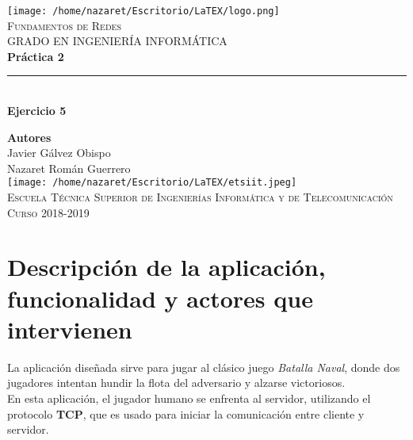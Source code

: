 \documentclass[11pt,a4paper]{article}
\begin{document}
\begin{titlepage}

\begin{minipage}{\textwidth}

\centering
\texttt{[image: /home/nazaret/Escritorio/LaTEX/logo.png]}\\

\textsc{\Large Fundamentos de Redes\\[0.2cm]}
\textsc{GRADO EN INGENIERÍA INFORMÁTICA}\\[1cm]

{\Huge\bfseries Práctica 2\\}
\noindent\rule[-1ex]{\textwidth}{3pt}\\[3.5ex]
{\large\bfseries Ejercicio 5}
\end{minipage}

\vspace{1.5cm}
\begin{minipage}{\textwidth}
\centering

\textbf{Autores}\\ {Javier Gálvez Obispo\\Nazaret Román Guerrero}\\[2.5ex]
\texttt{[image: /home/nazaret/Escritorio/LaTEX/etsiit.jpeg]}\\[0.1cm]
\vspace{1cm}
\textsc{Escuela Técnica Superior de Ingenierías Informática y de Telecomunicación}\\
\vspace{1cm}
\textsc{Curso 2018-2019}
\end{minipage}
\end{titlepage}

\tableofcontents
\thispagestyle{empty}

\newpage

\section{Descripción de la aplicación, funcionalidad y actores que intervienen}

La aplicación diseñada sirve para jugar al clásico juego \textit{Batalla Naval}, donde dos jugadores intentan hundir la flota del adversario y alzarse victoriosos.\\

En esta aplicación, el jugador humano se enfrenta al servidor, utilizando el protocolo \textsc{\textbf{TCP}}, que es usado para iniciar la comunicación entre cliente y servidor.\\
\end{document}
